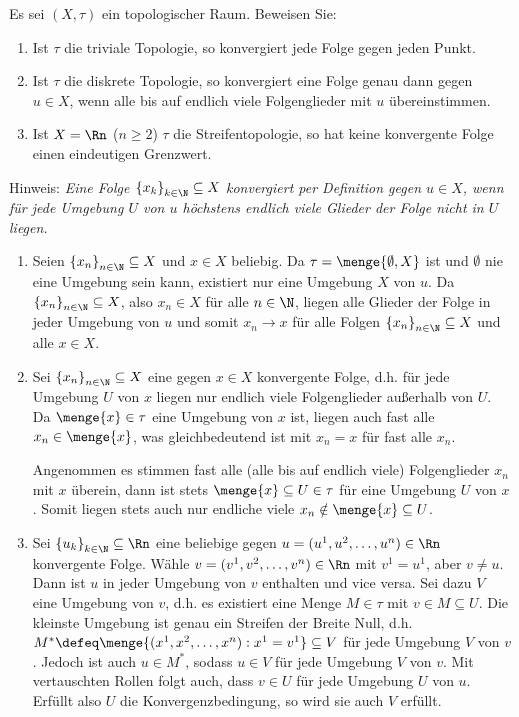 \begin{exercisePage}
\begin{exercise}
	Es sei $(X, \tau)$ ein topologischer Raum. Beweisen Sie:
	\begin{enumerate}[leftmargin=*, nolistsep, topsep=-\parskip]
		\item Ist $\tau$ die triviale Topologie, so konvergiert jede Folge gegen jeden Punkt.
		\item Ist $\tau$ die diskrete Topologie, so konvergiert eine Folge genau dann gegen $u \in X$, wenn alle bis auf endlich viele Folgenglieder mit $u$ übereinstimmen.
		\item  Ist $X = \Rn$ ($n \ge 2$) $\tau$ die Streifentopologie, so hat keine konvergente Folge einen eindeutigen Grenzwert.
	\end{enumerate}
	Hinweis: \textit{Eine Folge $\folge{x_k}{k \in \N} \subseteq X$ konvergiert per Definition gegen $u \in X$, wenn für jede Umgebung $U$ von $u$ höchstens endlich viele Glieder der Folge nicht in $U$ liegen.}
\end{exercise}

\begin{enumerate}[label=(zu \alph*)]
	\item Seien $\folge{x_n}{n \in \N} \subseteq X$ und $x \in X$ beliebig. Da $\tau = \menge{\emptyset, X}$ ist und $\emptyset$ nie eine Umgebung sein kann, existiert nur eine Umgebung $X$ von $u$. Da $\folge{x_n}{n \in \N} \subseteq X$, also $x_n \in X$ für alle $n \in \N$, liegen alle Glieder der Folge in jeder Umgebung von $u$ und somit $x_n \to x$ für alle Folgen $\folge{x_n}{n \in \N} \subseteq X$ und alle $x \in X$.
	\item Sei $\folge{x_n}{n \in \N} \subseteq X$ eine gegen $x \in X$ konvergente Folge, d.h. für jede Umgebung $U$ von $x$ liegen nur endlich viele Folgenglieder außerhalb von $U$. Da $\menge{x} \in \tau$ eine Umgebung von $x$ ist, liegen auch fast alle $x_n \in \menge{x}$, was gleichbedeutend ist mit $x_n = x$ für fast alle $x_n$.
	
	Angenommen es stimmen fast alle (alle bis auf endlich viele) Folgenglieder $x_n$ mit $x$ überein, dann ist stets $\menge{x} \subseteq U \in \tau$ für eine Umgebung $U$ von $x$. Somit liegen stets auch nur endliche viele $x_n \notin \menge{x} \subseteq U$.
	\item Sei $\folge{u_k}{k \in \N} \subseteq \Rn$ eine beliebige gegen $u = (u^1, u^2 , \dots , u^n) \in \Rn$ konvergente Folge. %
	Wähle $v = (v^1, v^2, \dots , v^n) \in \Rn$ mit $v^1 = u^1$, aber $v \neq u$. Dann ist $u$ in jeder Umgebung von $v$ enthalten und vice versa. Sei dazu $V$ eine Umgebung von $v$, d.h. es existiert eine Menge $M \in \tau$ mit $v \in M \subseteq U$. Die kleinste Umgebung ist genau ein Streifen der Breite Null, d.h. $M^\ast \defeq \menge{(x^1, x^2, \dots, x^n): x^1 = v^1} \subseteq V$ für jede Umgebung $V$ von $v$. Jedoch ist auch $u \in M^\ast$, sodass $u \in V$ für jede Umgebung $V$ von $v$. Mit vertauschten Rollen folgt auch, dass $v \in U$ für jede Umgebung $U$ von $u$. Erfüllt also $U$ die Konvergenzbedingung, so wird sie auch $V$ erfüllt.
\end{enumerate}
\end{exercisePage}